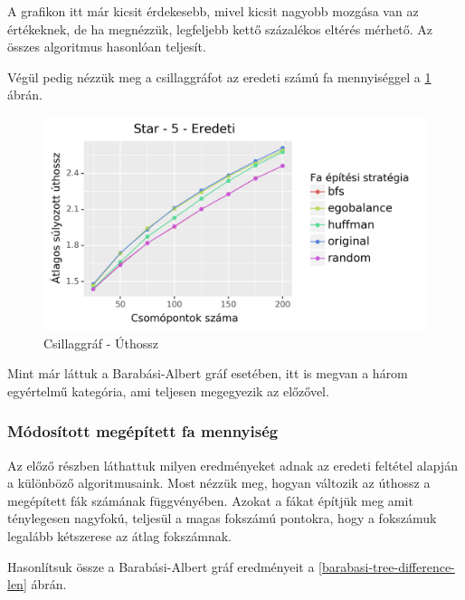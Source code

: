 \documentclass[12pt]{report}
\begin{document}
A grafikon itt már kicsit érdekesebb, mivel kicsit nagyobb mozgása van az értékeknek, de ha megnézzük, legfeljebb kettő százalékos eltérés mérhető.
Az összes algoritmus hasonlóan teljesít.   

Végül pedig nézzük meg a csillaggráfot az eredeti számú fa mennyiséggel a \ref{star-len} ábrán.

\begin{figure}[H]
	\begin{center}
		\includegraphics[width=0.9\linewidth]{pictures/star_len_e.png}
		\caption{Csillaggráf - Úthossz}
		\label{star-len}
	\end{center}
\end{figure}

Mint már láttuk a Barabási-Albert gráf esetében, itt is megvan a három egyértelmű kategória, ami teljesen megegyezik az előzővel.

\subsubsection{Módosított megépített fa mennyiség}

Az előző részben láthattuk milyen eredményeket adnak az eredeti feltétel alapján a különböző algoritmusaink.
Most nézzük meg, hogyan változik az úthossz a megépített fák számának függvényében. 
Azokat a fákat építjük meg amit ténylegesen nagyfokú, teljesül a magas fokszámú pontokra, hogy a fokszámuk legalább kétszerese az átlag fokszámnak.

Hasonlítsuk össze a Barabási-Albert gráf eredményeit a \ref{barabasi-tree-difference-len} ábrán.
\end{document}

